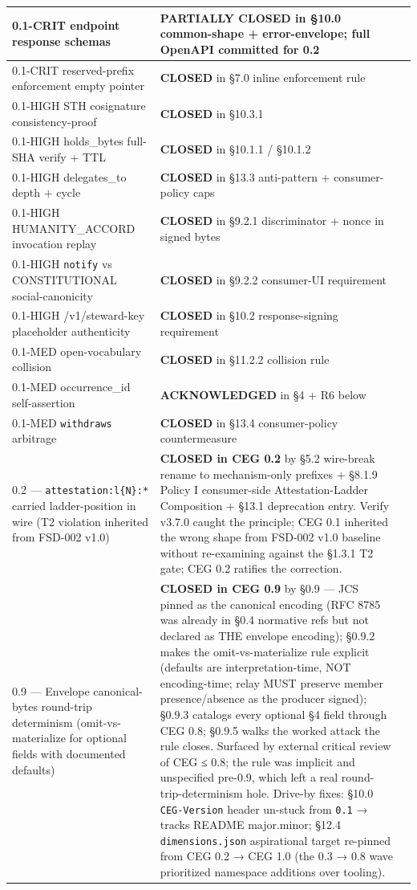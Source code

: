 \documentclass[10pt]{article}
\begin{document}
{\begin{longtable}{|p{5.33cm}|p{5.33cm}|p{5.33cm}|}
0.1-CRIT endpoint response schemas & \textbf{PARTIALLY CLOSED} in §10.0 common-shape + error-envelope; full OpenAPI committed for 0.2 &  \\ \hline
0.1-CRIT reserved-prefix enforcement empty pointer & \textbf{CLOSED} in §7.0 inline enforcement rule &  \\ \hline
0.1-HIGH STH cosignature consistency-proof & \textbf{CLOSED} in §10.3.1 &  \\ \hline
0.1-HIGH holds\_bytes full-SHA verify + TTL & \textbf{CLOSED} in §10.1.1 / §10.1.2 &  \\ \hline
0.1-HIGH delegates\_to depth + cycle & \textbf{CLOSED} in §13.3 anti-pattern + consumer-policy caps &  \\ \hline
0.1-HIGH HUMANITY\_ACCORD invocation replay & \textbf{CLOSED} in §9.2.1 discriminator + nonce in signed bytes &  \\ \hline
0.1-HIGH \texttt{notify} vs CONSTITUTIONAL social-canonicity & \textbf{CLOSED} in §9.2.2 consumer-UI requirement &  \\ \hline
0.1-HIGH /v1/steward-key placeholder authenticity & \textbf{CLOSED} in §10.2 response-signing requirement &  \\ \hline
0.1-MED open-vocabulary collision & \textbf{CLOSED} in §11.2.2 collision rule &  \\ \hline
0.1-MED occurrence\_id self-assertion & \textbf{ACKNOWLEDGED} in §4 + R6 below &  \\ \hline
0.1-MED \texttt{withdraws} arbitrage & \textbf{CLOSED} in §13.4 consumer-policy countermeasure &  \\ \hline
0.2 — \texttt{attestation:l\{N\}:*} carried ladder-position in wire (T2 violation inherited from FSD-002 v1.0) & \textbf{CLOSED in CEG 0.2} by §5.2 wire-break rename to mechanism-only prefixes + §8.1.9 Policy I consumer-side Attestation-Ladder Composition + §13.1 deprecation entry. Verify v3.7.0 caught the principle; CEG 0.1 inherited the wrong shape from FSD-002 v1.0 baseline without re-examining against the §1.3.1 T2 gate; CEG 0.2 ratifies the correction. &  \\ \hline
0.9 — Envelope canonical-bytes round-trip determinism (omit-vs-materialize for optional fields with documented defaults) & \textbf{CLOSED in CEG 0.9} by §0.9 — JCS pinned as the canonical encoding (RFC 8785 was already in §0.4 normative refs but not declared as THE envelope encoding); §0.9.2 makes the omit-vs-materialize rule explicit (defaults are interpretation-time, NOT encoding-time; relay MUST preserve member presence/absence as the producer signed); §0.9.3 catalogs every optional §4 field through CEG 0.8; §0.9.5 walks the worked attack the rule closes. Surfaced by external critical review of CEG ≤ 0.8; the rule was implicit and unspecified pre-0.9, which left a real round-trip-determinism hole. Drive-by fixes: §10.0 \texttt{CEG-Version} header un-stuck from \texttt{0.1} → tracks README major.minor; §12.4 \texttt{dimensions.json} aspirational target re-pinned from CEG 0.2 → CEG 1.0 (the 0.3 → 0.8 wave prioritized namespace additions over tooling). &  \\ \hline

\end{longtable}}
\end{document}
